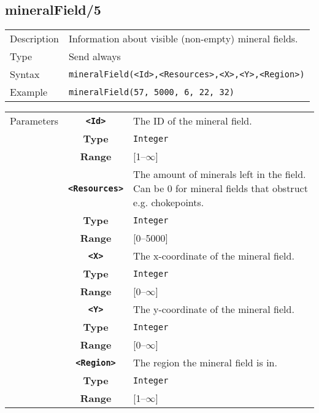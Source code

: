 \subsection{mineralField/5}
\begin{tabularx}{\textwidth}{lX}
 Description & Information about visible (non-empty) mineral fields. \\
 Type & Send always \\
 Syntax & \verb|mineralField(<Id>,<Resources>,<X>,<Y>,<Region>)| \\
 Example & \verb|mineralField(57, 5000, 6, 22, 32)| \\
 \end{tabularx}
 \begin{tabularx}{\textwidth}{l | c | p{8cm}|}
 \cline{2-3}
 Parameters & \textbf{\verb|<Id>|} & The ID of the mineral field.\\
            & \textbf{Type} & \verb|Integer| \\
            & \textbf{Range} & [1--$\infty$] \\
            \cline{2-3}
            & \textbf{\verb|<Resources>|} & The amount of minerals left in the field. Can be 0 for mineral fields that obstruct e.g. chokepoints.\\
            & \textbf{Type} & \verb|Integer| \\
            & \textbf{Range} & [0--5000] \\
            \cline{2-3}
            & \textbf{\verb|<X>|} & The x-coordinate of the mineral field.\\
            & \textbf{Type} & \verb|Integer| \\
            & \textbf{Range} & [0--$\infty$] \\
            \cline{2-3}
            & \textbf{\verb|<Y>|} & The y-coordinate of the mineral field.\\
            & \textbf{Type} & \verb|Integer| \\
            & \textbf{Range} & [0--$\infty$] \\
            \cline{2-3}
            & \textbf{\verb|<Region>|} & The region the mineral field is in.\\
            & \textbf{Type} & \verb|Integer| \\
            & \textbf{Range} & [1--$\infty$] \\
            \cline{2-3}
\end{tabularx}


